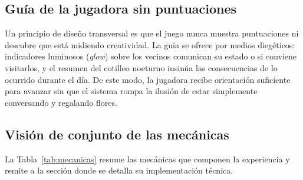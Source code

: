 \documentclass[12pt,twoside,titlepage]{report}
\begin{document}
\subsection{Guía de la jugadora sin puntuaciones}

Un principio de diseño transversal es que el juego nunca muestra puntuaciones ni descubre que está midiendo creatividad. La guía se ofrece por medios diegéticos: indicadores luminosos (\textit{glow}) sobre los vecinos comunican su estado o si conviene visitarlos, y el resumen del cotilleo nocturno insinúa las consecuencias de lo ocurrido durante el día. De este modo, la jugadora recibe orientación suficiente para avanzar sin que el sistema rompa la ilusión de estar simplemente conversando y regalando flores.

\subsection{Visión de conjunto de las mecánicas}

La Tabla~\ref{tab:mecanicas} resume las mecánicas que componen la experiencia y remite a la sección donde se detalla su implementación técnica.
\end{document}
